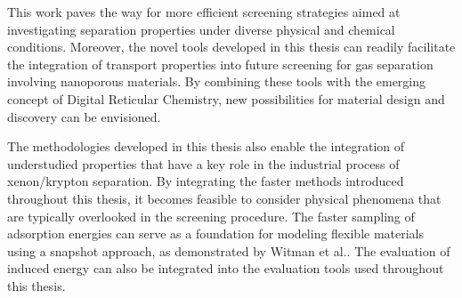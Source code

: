  
\begin{center}
\end{center}


This work paves the way for more efficient screening strategies aimed at investigating separation properties under diverse physical and chemical conditions. Moreover, the novel tools developed in this thesis can readily facilitate the integration of transport properties into future screening for gas separation involving nanoporous materials. By combining these tools with the emerging concept of Digital Reticular Chemistry,\autocite{Lyu_2020} new possibilities for material design and discovery can be envisioned.

The methodologies developed in this thesis also enable the integration of understudied properties that have a key role in the industrial process of xenon/krypton separation. By integrating the faster methods introduced throughout this thesis, it becomes feasible to consider physical phenomena that are typically overlooked in the screening procedure. The faster sampling of adsorption energies can serve as a foundation for modeling flexible materials using a snapshot approach, as demonstrated by Witman et al.\autocite{Witman_2017}. The evaluation of induced energy\autocite{Lachet_1998} can also be integrated into the evaluation tools used throughout this thesis. 



\vfill
\begin{center}
\end{center}
\vfill\vfill
